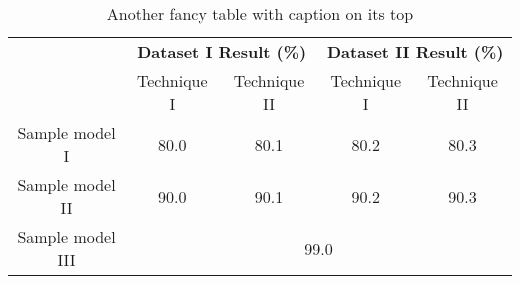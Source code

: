 \begin{table}[!htbp]
  \begin{center}
    \caption{Another fancy table with caption on its top}
    \label{table4}
    \begin{tabular}{|c|c|c|c|c|} 
    \hline
      & \multicolumn{2}{c|}{\textbf{Dataset I Result (\%)}} & \multicolumn{2}{c|}{\textbf{Dataset II Result (\%)}}\\ \cline{2-5}
      & Technique I & Technique II & Technique I & Technique II \\ 
      \hline \hline
        Sample model I & 80.0 & 80.1 & 80.2 & 80.3\\ \hline
        Sample model II  & 90.0 & 90.1 & 90.2 & 90.3\\ \hline
        Sample model III & \multicolumn{4}{c|}{99.0}\\
    \hline
    \end{tabular}
  \end{center}
\end{table}